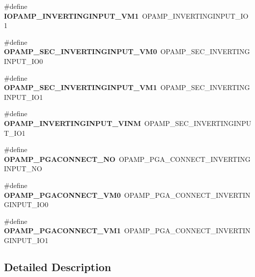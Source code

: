 \begin{DoxyCompactItemize}
\item 
\#define {\bfseries I\+O\+P\+A\+M\+P\+\_\+\+I\+N\+V\+E\+R\+T\+I\+N\+G\+I\+N\+P\+U\+T\+\_\+\+V\+M1}~O\+P\+A\+M\+P\+\_\+\+I\+N\+V\+E\+R\+T\+I\+N\+G\+I\+N\+P\+U\+T\+\_\+\+I\+O1\hypertarget{group___h_a_l___o_p_a_m_p___aliased___defines_ga375723a55ef087438b5614070f7daab6}{}\label{group___h_a_l___o_p_a_m_p___aliased___defines_ga375723a55ef087438b5614070f7daab6}

\item 
\#define {\bfseries O\+P\+A\+M\+P\+\_\+\+S\+E\+C\+\_\+\+I\+N\+V\+E\+R\+T\+I\+N\+G\+I\+N\+P\+U\+T\+\_\+\+V\+M0}~O\+P\+A\+M\+P\+\_\+\+S\+E\+C\+\_\+\+I\+N\+V\+E\+R\+T\+I\+N\+G\+I\+N\+P\+U\+T\+\_\+\+I\+O0\hypertarget{group___h_a_l___o_p_a_m_p___aliased___defines_ga2deb27c0ae55e51ce5e529b8ca12a5bf}{}\label{group___h_a_l___o_p_a_m_p___aliased___defines_ga2deb27c0ae55e51ce5e529b8ca12a5bf}

\item 
\#define {\bfseries O\+P\+A\+M\+P\+\_\+\+S\+E\+C\+\_\+\+I\+N\+V\+E\+R\+T\+I\+N\+G\+I\+N\+P\+U\+T\+\_\+\+V\+M1}~O\+P\+A\+M\+P\+\_\+\+S\+E\+C\+\_\+\+I\+N\+V\+E\+R\+T\+I\+N\+G\+I\+N\+P\+U\+T\+\_\+\+I\+O1\hypertarget{group___h_a_l___o_p_a_m_p___aliased___defines_ga64e070f02a3a612aa9307cd3d7be8cb9}{}\label{group___h_a_l___o_p_a_m_p___aliased___defines_ga64e070f02a3a612aa9307cd3d7be8cb9}

\item 
\#define {\bfseries O\+P\+A\+M\+P\+\_\+\+I\+N\+V\+E\+R\+T\+I\+N\+G\+I\+N\+P\+U\+T\+\_\+\+V\+I\+NM}~O\+P\+A\+M\+P\+\_\+\+S\+E\+C\+\_\+\+I\+N\+V\+E\+R\+T\+I\+N\+G\+I\+N\+P\+U\+T\+\_\+\+I\+O1\hypertarget{group___h_a_l___o_p_a_m_p___aliased___defines_gafe28bec51c15b3c50797e6cb12e271bc}{}\label{group___h_a_l___o_p_a_m_p___aliased___defines_gafe28bec51c15b3c50797e6cb12e271bc}

\item 
\#define {\bfseries O\+P\+A\+M\+P\+\_\+\+P\+G\+A\+C\+O\+N\+N\+E\+C\+T\+\_\+\+NO}~O\+P\+A\+M\+P\+\_\+\+P\+G\+A\+\_\+\+C\+O\+N\+N\+E\+C\+T\+\_\+\+I\+N\+V\+E\+R\+T\+I\+N\+G\+I\+N\+P\+U\+T\+\_\+\+NO\hypertarget{group___h_a_l___o_p_a_m_p___aliased___defines_gae834f2fc0846277de623320d541d2b83}{}\label{group___h_a_l___o_p_a_m_p___aliased___defines_gae834f2fc0846277de623320d541d2b83}

\item 
\#define {\bfseries O\+P\+A\+M\+P\+\_\+\+P\+G\+A\+C\+O\+N\+N\+E\+C\+T\+\_\+\+V\+M0}~O\+P\+A\+M\+P\+\_\+\+P\+G\+A\+\_\+\+C\+O\+N\+N\+E\+C\+T\+\_\+\+I\+N\+V\+E\+R\+T\+I\+N\+G\+I\+N\+P\+U\+T\+\_\+\+I\+O0\hypertarget{group___h_a_l___o_p_a_m_p___aliased___defines_gad9238e09b6c72142f797d4a0cccef921}{}\label{group___h_a_l___o_p_a_m_p___aliased___defines_gad9238e09b6c72142f797d4a0cccef921}

\item 
\#define {\bfseries O\+P\+A\+M\+P\+\_\+\+P\+G\+A\+C\+O\+N\+N\+E\+C\+T\+\_\+\+V\+M1}~O\+P\+A\+M\+P\+\_\+\+P\+G\+A\+\_\+\+C\+O\+N\+N\+E\+C\+T\+\_\+\+I\+N\+V\+E\+R\+T\+I\+N\+G\+I\+N\+P\+U\+T\+\_\+\+I\+O1\hypertarget{group___h_a_l___o_p_a_m_p___aliased___defines_ga8a371a8519c5350bba225e66b4d82ef1}{}\label{group___h_a_l___o_p_a_m_p___aliased___defines_ga8a371a8519c5350bba225e66b4d82ef1}

\end{DoxyCompactItemize}


\subsection{Detailed Description}
